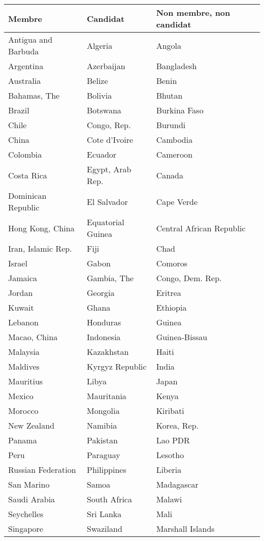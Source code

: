 \begin{longtable}{|l|l|l|}
\hline
Membre&Candidat&Non membre, non candidat\\
\hline
Antigua and Barbuda&Algeria&Angola\\
\hline
Argentina&Azerbaijan&Bangladesh\\
\hline
Australia&Belize&Benin\\
\hline
Bahamas, The&Bolivia&Bhutan\\
\hline
Brazil&Botswana&Burkina Faso\\
\hline
Chile&Congo, Rep.&Burundi\\
\hline
China&Cote d'Ivoire&Cambodia\\
\hline
Colombia&Ecuador&Cameroon\\
\hline
Costa Rica&Egypt, Arab Rep.&Canada\\
\hline
Dominican Republic&El Salvador&Cape Verde\\
\hline
Hong Kong, China&Equatorial Guinea&Central African Republic\\
\hline
Iran, Islamic Rep.&Fiji&Chad\\
\hline
Israel&Gabon&Comoros\\
\hline
Jamaica&Gambia, The&Congo, Dem. Rep.\\
\hline
Jordan&Georgia&Eritrea\\
\hline
Kuwait&Ghana&Ethiopia\\
\hline
Lebanon&Honduras&Guinea\\
\hline
Macao, China&Indonesia&Guinea-Bissau\\
\hline
Malaysia&Kazakhstan&Haiti\\
\hline
Maldives&Kyrgyz Republic&India\\
\hline
Mauritius&Libya&Japan\\
\hline
Mexico&Mauritania&Kenya\\
\hline
Morocco&Mongolia&Kiribati\\
\hline
New Zealand&Namibia&Korea, Rep.\\
\hline
Panama&Pakistan&Lao PDR\\
\hline
Peru&Paraguay&Lesotho\\
\hline
Russian Federation&Philippines&Liberia\\
\hline
San Marino&Samoa&Madagascar\\
\hline
Saudi Arabia&South Africa&Malawi\\
\hline
Seychelles&Sri Lanka&Mali\\
\hline
Singapore&Swaziland&Marshall Islands\\

\end{longtable}
